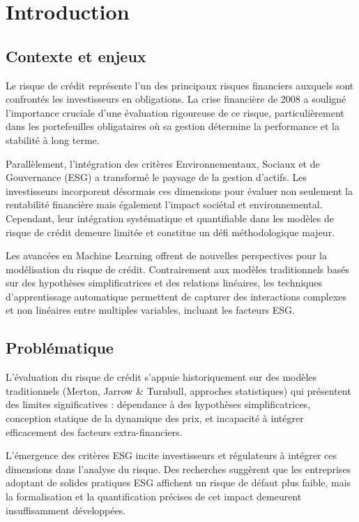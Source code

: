 \chapter{Introduction}

\section{Contexte et enjeux}

Le risque de crédit représente l'un des principaux risques financiers auxquels sont confrontés les investisseurs en obligations. La crise financière de 2008 a souligné l'importance cruciale d'une évaluation rigoureuse de ce risque, particulièrement dans les portefeuilles obligataires où sa gestion détermine la performance et la stabilité à long terme.

Parallèlement, l'intégration des critères Environnementaux, Sociaux et de Gouvernance (ESG) a transformé le paysage de la gestion d'actifs. Les investisseurs incorporent désormais ces dimensions pour évaluer non seulement la rentabilité financière mais également l'impact sociétal et environnemental. Cependant, leur intégration systématique et quantifiable dans les modèles de risque de crédit demeure limitée et constitue un défi méthodologique majeur.

Les avancées en Machine Learning offrent de nouvelles perspectives pour la modélisation du risque de crédit. Contrairement aux modèles traditionnels basés sur des hypothèses simplificatrices et des relations linéaires, les techniques d'apprentissage automatique permettent de capturer des interactions complexes et non linéaires entre multiples variables, incluant les facteurs ESG.

\section{Problématique}

L'évaluation du risque de crédit s'appuie historiquement sur des modèles traditionnels (Merton, Jarrow & Turnbull, approches statistiques) qui présentent des limites significatives : dépendance à des hypothèses simplificatrices, conception statique de la dynamique des prix, et incapacité à intégrer efficacement des facteurs extra-financiers.

L'émergence des critères ESG incite investisseurs et régulateurs à intégrer ces dimensions dans l'analyse du risque. Des recherches suggèrent que les entreprises adoptant de solides pratiques ESG affichent un risque de défaut plus faible, mais la formalisation et la quantification précises de cet impact demeurent insuffisamment développées.

